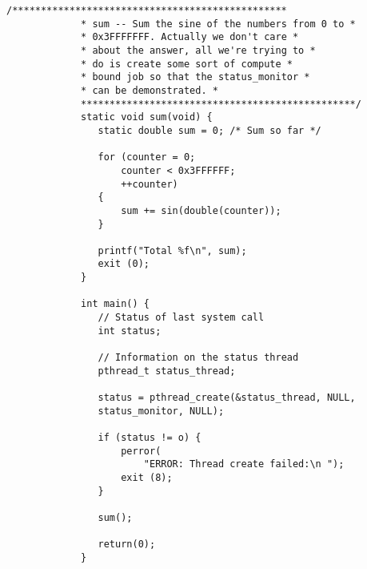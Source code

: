 \begin{LTR}
\begin{lstlisting}[style=C++Style]
             /************************************************
             * sum -- Sum the sine of the numbers from 0 to *
             * 0x3FFFFFFF. Actually we don't care *
             * about the answer, all we're trying to *
             * do is create some sort of compute *
             * bound job so that the status_monitor *
             * can be demonstrated. *
             ************************************************/
             static void sum(void) {
             	static double sum = 0; /* Sum so far */

             	for (counter = 0;
             		counter < 0x3FFFFFF;
             		++counter)
             	{
             		sum += sin(double(counter));
             	}

             	printf("Total %f\n", sum);
             	exit (0);
             }

             int main() {
             	// Status of last system call
             	int status;

             	// Information on the status thread
             	pthread_t status_thread;

             	status = pthread_create(&status_thread, NULL,
             	status_monitor, NULL);

             	if (status != o) {
             		perror(
             			"ERROR: Thread create failed:\n ");
             		exit (8);
             	}

             	sum();

             	return(0);
             }
        \end{lstlisting}
\end{LTR}
